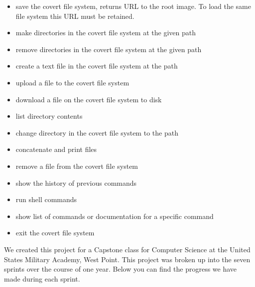 \documentclass[letterpaper,12pt,openany,oneside]{sphinxmanual}
\begin{document}
\begin{itemize}
\begin{itemize}
\item {} 
 save the covert file system, returns URL to the root image. To load the same file system this URL must be retained.

\item {} 
 make directories in the covert file system at the given path

\item {} 
 remove directories in the covert file system at the given path

\item {} 
 create a text file in the covert file system at the path

\item {} 
 upload a file to the covert file system

\item {} 
 download a file on the covert file system to disk

\item {} 
 list directory contents

\item {} 
 change directory in the covert file system to the path

\item {} 
 concatenate and print files

\item {} 
 remove a file from the covert file system

\item {} 
 show the history of previous commands

\item {} 
 run shell commands

\item {} 
 show list of commands or documentation for a specific command

\item {} 
 exit the covert file system

\end{itemize}

\end{itemize}

We created this project for a Capstone class for Computer Science at the United States Military Academy, West Point. This project was broken up into the seven sprints over the course of one year. Below you can find the progress we have made during each sprint.
\end{document}
